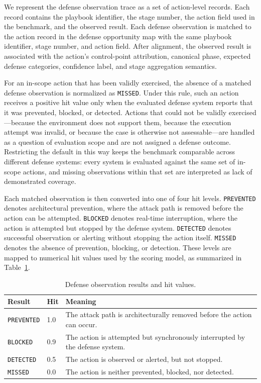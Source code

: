 We represent the defense observation trace as a set of action-level records. Each record contains the playbook identifier, the stage number, the action field used in the benchmark, and the observed result. Each defense observation is matched to the action record in the defense opportunity map with the same playbook identifier, stage number, and action field. After alignment, the observed result is associated with the action's control-point attribution, canonical phase, expected defense categories, confidence label, and stage aggregation semantics.

For an in-scope action that has been validly exercised, the absence of a matched defense observation is normalized as \texttt{MISSED}. Under this rule, such an action receives a positive hit value only when the evaluated defense system reports that it was prevented, blocked, or detected. Actions that could not be validly exercised---because the environment does not support them, because the execution attempt was invalid, or because the case is otherwise not assessable---are handled as a question of evaluation scope and are not assigned a defense outcome. Restricting the default in this way keeps the benchmark comparable across different defense systems: every system is evaluated against the same set of in-scope actions, and missing observations within that set are interpreted as lack of demonstrated coverage.

Each matched observation is then converted into one of four hit levels. \texttt{PREVENTED} denotes architectural prevention, where the attack path is removed before the action can be attempted. \texttt{BLOCKED} denotes real-time interruption, where the action is attempted but stopped by the defense system. \texttt{DETECTED} denotes successful observation or alerting without stopping the action itself. \texttt{MISSED} denotes the absence of prevention, blocking, or detection. These levels are mapped to numerical hit values used by the scoring model, as summarized in Table~\ref{tab:hit-levels}.

\begin{table}[t]
\centering
\caption{Defense observation results and hit values.}
\label{tab:hit-levels}
\begin{tabular}{p{}p{}p{}}
\hline
Result & Hit & Meaning \\
\hline
\texttt{PREVENTED} & 1.0 & The attack path is architecturally removed before the action can occur. \\
\texttt{BLOCKED} & 0.9 & The action is attempted but synchronously interrupted by the defense system. \\
\texttt{DETECTED} & 0.5 & The action is observed or alerted, but not stopped. \\
\texttt{MISSED} & 0.0 & The action is neither prevented, blocked, nor detected. \\
\hline
\end{tabular}
\end{table}

